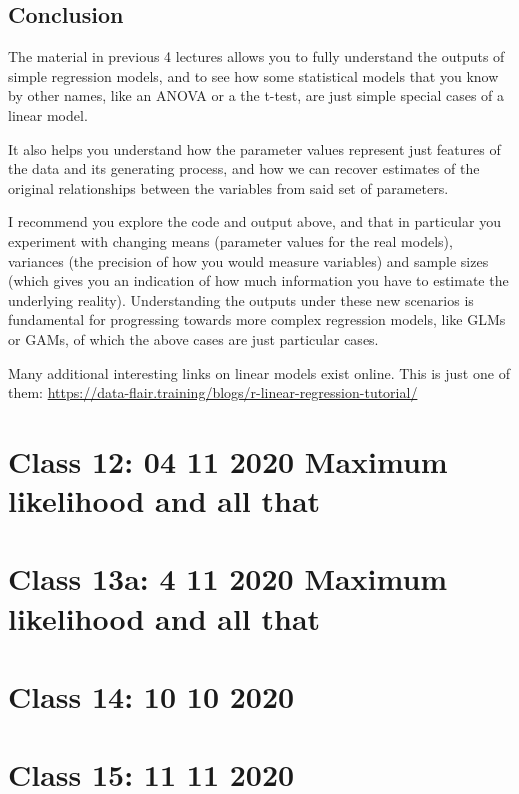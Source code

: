 \documentclass[
]{book}
\begin{document}
\hypertarget{conclusion}{%
\section{Conclusion}\label{conclusion}}

The material in previous 4 lectures allows you to fully understand the outputs of simple regression models, and to see how some statistical models that you know by other names, like an ANOVA or a the t-test, are just simple special cases of a linear model.

It also helps you understand how the parameter values represent just features of the data and its generating process, and how we can recover estimates of the original relationships between the variables from said set of parameters.

I recommend you explore the code and output above, and that in particular you experiment with changing means (parameter values for the real models), variances (the precision of how you would measure variables) and sample sizes (which gives you an indication of how much information you have to estimate the underlying reality). Understanding the outputs under these new scenarios is fundamental for progressing towards more complex regression models, like GLMs or GAMs, of which the above cases are just particular cases.

Many additional interesting links on linear models exist online. This is just one of them: \url{https://data-flair.training/blogs/r-linear-regression-tutorial/}

\hypertarget{aula12}{%
\chapter{Class 12: 04 11 2020 Maximum likelihood and all that}\label{aula12}}

\hypertarget{aula13a}{%
\chapter{Class 13a: 4 11 2020 Maximum likelihood and all that}\label{aula13a}}

\hypertarget{aula14}{%
\chapter{Class 14: 10 10 2020}\label{aula14}}

\hypertarget{aula15}{%
\chapter{Class 15: 11 11 2020}\label{aula15}}
\end{document}
